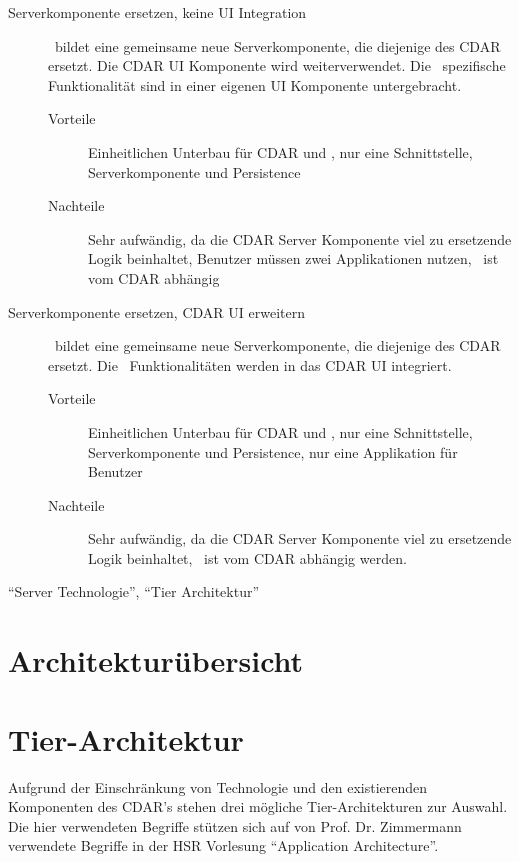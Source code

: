 {{\begin{description}
					\item[Serverkomponente ersetzen, keine UI Integration]
					\eeppi\ bildet eine gemeinsame neue Serverkomponente, die diejenige des CDAR ersetzt. Die CDAR UI Komponente wird weiterverwendet. 
					Die \eeppi\ spezifische Funktionalität sind in einer eigenen UI Komponente untergebracht.
					\begin{description}
						\item[Vorteile] Einheitlichen Unterbau für CDAR und \eeppi, nur eine Schnittstelle, Serverkomponente und Persistence
						\item[Nachteile] Sehr aufwändig, da die CDAR Server Komponente viel zu ersetzende Logik beinhaltet, Benutzer müssen zwei Applikationen nutzen, \eeppi\ ist vom CDAR abhängig
					\end{description}
					
					\item[Serverkomponente ersetzen, CDAR UI erweitern]
					\eeppi\ bildet eine gemeinsame neue Serverkomponente, die diejenige des CDAR ersetzt. Die \eeppi\ Funktionalitäten werden in das CDAR UI integriert.
					\begin{description}
						\item[Vorteile] Einheitlichen Unterbau für CDAR und \eeppi, nur eine Schnittstelle, Serverkomponente und Persistence, nur eine Applikation für Benutzer
						\item[Nachteile] Sehr aufwändig, da die CDAR Server Komponente viel zu ersetzende Logik beinhaltet, \eeppi\ ist vom CDAR abhängig werden.
					\end{description}
				\end{description}
			}
			{}
			{}
			{}
			{"`Server Technologie"', "`Tier Architektur"'}
		}
		

	\section{Architekturübersicht}
	
	
	\section{Tier-Architektur}
		Aufgrund der Einschränkung von Technologie und den existierenden Komponenten des CDAR's stehen drei mögliche Tier-Architekturen zur Auswahl.
		Die hier verwendeten Begriffe stützen sich auf von Prof. Dr. Zimmermann verwendete Begriffe in der HSR Vorlesung "`Application Architecture"'\cite{prof._dr._zimmerman_layers_20144}.		
		
